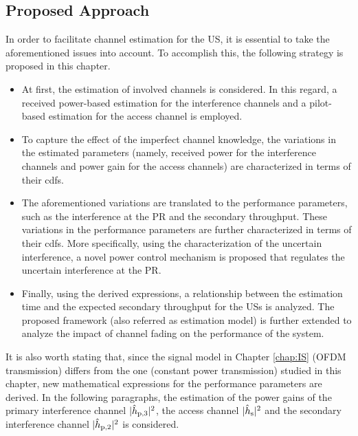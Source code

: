 \subsection{Proposed Approach} 
In order to facilitate channel estimation for the US, it is essential to take the aforementioned issues into account. To accomplish this, the following strategy is proposed in this chapter.
\begin{itemize}
\item At first, the estimation of involved channels is considered. In this regard, a received power-based estimation for the interference channels and a pilot-based estimation for the access channel is employed. 
\item To capture the effect of the imperfect channel knowledge, the variations in the estimated parameters (namely, received power for the interference channels and power gain for the access channels) are characterized in terms of their cdfs.
\item The aforementioned variations are translated to the performance parameters, such as the interference at the PR and the secondary throughput. These variations in the performance parameters are further characterized in terms of their cdfs. More specifically, using the characterization of the uncertain interference, a novel power control mechanism is proposed that regulates the uncertain interference at the PR.  
\item Finally, using the derived expressions, a relationship between the estimation time and the expected secondary throughput for the USs is analyzed. The proposed framework (also referred as estimation model) is further extended to analyze the impact of channel fading on the performance of the system. 
\end{itemize}
It is also worth stating that, since the signal model in Chapter \ref{chap:IS} (OFDM transmission) differs from the one (constant power transmission) studied in this chapter, new mathematical expressions for the performance parameters are derived. In the following paragraphs, the estimation of the power gains of the primary interference channel $|\hat{h}_{\text{p,3}}|^2$, the access channel $|\hat{h}_{\text{s}}|^2$ and the secondary interference channel $|\hat{h}_{\text{p,2}}|^2$ is considered. 
